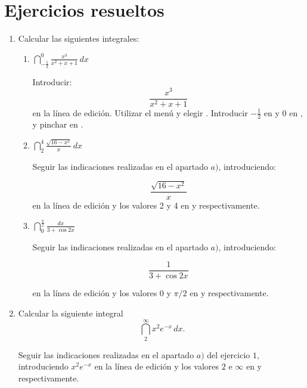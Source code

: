 \section{Ejercicios resueltos}
\begin{enumerate}[leftmargin=*]
\item Calcular las siguientes integrales:
\begin{enumerate}
\item $ \dint^{0}_{-\frac{1}{2}}{\frac{x^{3}}{x^{2}+x+1}}\,dx$
\begin{indication}
{Introducir:
\[
\frac{x^{3}}{x^{2}+x+1}
\]
en la línea de edición. Utilizar el menú 
y elegir . Introducir $-\frac{1}{2}$ en
 y 0 en , y pinchar
en . }
\end{indication}

\item $ \dint^{4}_{2}{\frac{\sqrt{16-x^{2}}}{x}\,dx}$

\begin{indication}
{Seguir las indicaciones realizadas en el apartado $a)$,
introduciendo:

\[
\frac{\sqrt{16-x^{2}}}{x}
\]
en la línea de edición y los valores 2 y 4 en  y  respectivamente.}
\end{indication}

\item $ \dint^{\frac{\pi}{2}}_{0}{\frac{dx}{3+\cos{2x}}}$

\begin{indication}
{Seguir las indicaciones realizadas en el apartado $a)$,
introduciendo:

\[
\frac{1}{3+\cos{2x}}
\]

en la línea de edición y los valores 0 y $\pi/2$ en  y  respectivamente.}
\end{indication}
\end{enumerate}

\item Calcular la siguiente integral
\[
\  \dint_{2}^{\infty}{x^{2}e^{-x}\,dx}.
\]

\begin{indication}
{Seguir las indicaciones realizadas en el apartado $a)$ del
ejercicio $1$, introduciendo $x^{2}e^{-x}$ en la línea de edición y
los valores $2$ e ${\infty}$ en 
 y  respectivamente.}
\end{indication}


\end{enumerate}
